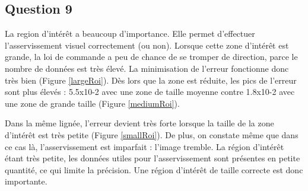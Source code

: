 \documentclass[a4paper,11pt]{article}
\begin{document}
\subsection{Question 9}
La region d'int\'er\^et a beaucoup d'importance. Elle permet d'effectuer l'asservissement visuel correctement (ou non). Lorsque cette zone d'int\'er\^et est grande, la loi de commande a peu de chance de se tromper de direction, parce le nombre de donn\'ees est tr\`es \'elev\'e. La minimisation de l'erreur fonctionne donc tr\`es bien (Figure \ref{largeRoi}). D\`es lors que la zone est r\'eduite, les pics de l'erreur sont plus \'elev\'es : 5.5x10-2 avec une zone de taille moyenne contre 1.8x10-2 avec une zone de grande taille (Figure \ref{mediumRoi}).
\par
Dans la m\^eme lign\'ee, l'erreur devient tr\`es forte lorsque la taille de la zone d'int\'er\^et est tr\`es petite (Figure \ref{smallRoi}). De plus, on constate m\^eme que dans ce cas l\`a, l'asservissement est imparfait : l'image tremble. La r\'egion d'int\'er\^et \'etant tr\`es petite, les donn\'ees utiles pour l'asservissement sont pr\'esentes en petite quantit\'e, ce qui limite la pr\'ecision. Une r\'egion d'int\'er\^et de taille correcte est donc importante.
\end{document}
